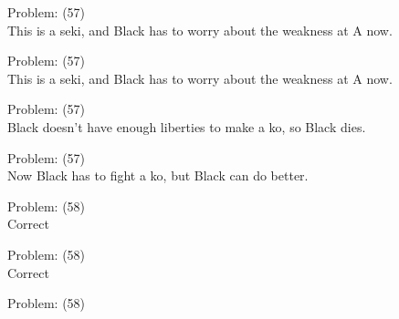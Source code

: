 \documentclass[11pt]{article}
\begin{document}
\begin{minipage}[t]{0.5\textwidth}
  {\centering
  
Problem: (57)\\
This is a seki, and Black has to worry about the weakness at A now.\\
  }
\end{minipage}
\begin{minipage}[t]{0.5\textwidth}
  {\centering
  
Problem: (57)\\
This is a seki, and Black has to worry about the weakness at A now.\\
  }
\end{minipage}
\begin{minipage}[t]{0.5\textwidth}
  {\centering
  
Problem: (57)\\
Black doesn't have enough liberties to make a ko, so Black dies.\\
  }
\end{minipage}
\begin{minipage}[t]{0.5\textwidth}
  {\centering
  
Problem: (57)\\
Now Black has to fight a ko, but Black can do better.\\
  }
\end{minipage}
\begin{minipage}[t]{0.5\textwidth}
  {\centering
  
Problem: (58)\\
Correct\\
  }
\end{minipage}
\begin{minipage}[t]{0.5\textwidth}
  {\centering
  
Problem: (58)\\
Correct\\
  }
\end{minipage}
\begin{minipage}[t]{0.5\textwidth}
  {\centering
  
Problem: (58)\\
  }
\end{minipage}
\end{document}

